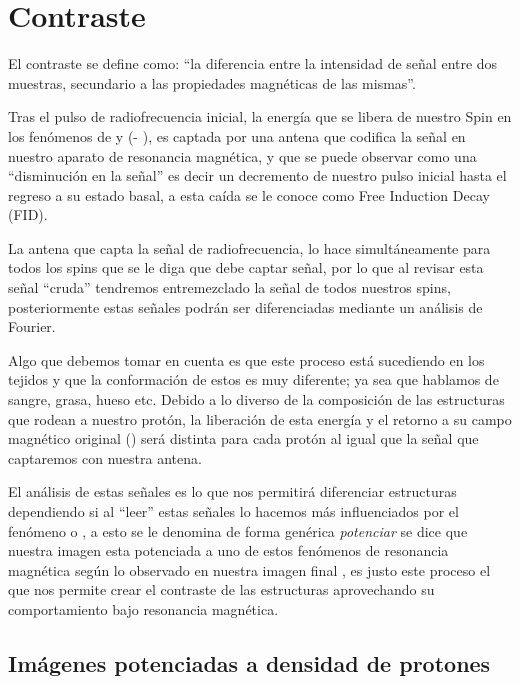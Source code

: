 \section{Contraste}


El contraste se define como: ``la diferencia entre la intensidad de señal entre dos muestras, secundario a las propiedades magnéticas de las mismas''.

Tras el pulso de radiofrecuencia inicial, la energía que se libera de nuestro Spin en los fenómenos de \Tone y \Ttwo (\Ttwop - \Ttwostar),  es captada por una antena que codifica la señal en nuestro aparato de resonancia magnética, y que se puede observar como una ``disminución en la señal'' es decir un decremento de nuestro pulso inicial hasta el regreso a su estado basal, a esta caída se le conoce como Free Induction Decay (FID).



La antena que capta la señal de radiofrecuencia, lo hace simultáneamente para todos los spins que se le diga que debe captar señal, por lo que al revisar esta señal ``cruda'' tendremos entremezclado la señal de todos nuestros spins, posteriormente estas señales podrán ser diferenciadas mediante un análisis de Fourier. 



Algo que debemos tomar en cuenta es que este proceso está sucediendo en los tejidos y que la conformación de estos es muy diferente; ya sea que hablamos de sangre, grasa, hueso etc. Debido a lo diverso de la composición de las estructuras que rodean a nuestro protón, la liberación de esta energía y el retorno a su campo magnético original (\Mz) será distinta para cada protón al igual que la señal que captaremos con nuestra antena.

El análisis de estas señales es lo que nos permitirá diferenciar estructuras dependiendo si al ``leer'' estas señales lo hacemos más influenciados por el fenómeno \Tone o \Ttwo, a esto se le denomina de forma genérica \textit{potenciar} se dice que nuestra imagen esta potenciada a uno de estos fenómenos de resonancia magnética según lo observado en nuestra imagen final , es justo este proceso el que nos permite crear el contraste de las estructuras aprovechando su comportamiento bajo resonancia magnética.


\subsection{Imágenes potenciadas a densidad de protones}

